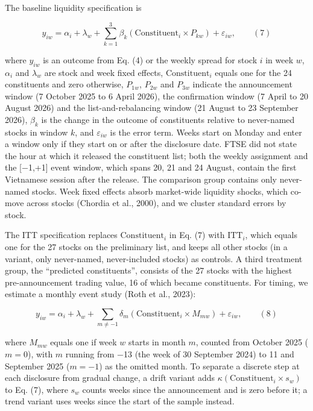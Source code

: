 The baseline liquidity specification is

\[y_{iw} = \alpha_i + \lambda_w + \sum_{k=1}^{3}\beta_k\left(\mathrm{Constituent}_i \times P_{kw}\right) + \varepsilon_{iw}, \qquad (7)\]

where \(y_{iw}\) is an outcome from Eq. (4) or the weekly spread for
stock \(i\) in week \(w\), \(\alpha_i\) and \(\lambda_w\) are stock and
week fixed effects, \(\mathrm{Constituent}_i\) equals one for the 24
constituents and zero otherwise, \(P_{1w}\), \(P_{2w}\) and \(P_{3w}\)
indicate the announcement window (7 October 2025 to 6 April 2026), the
confirmation window (7 April to 20 August 2026) and the
list-and-rebalancing window (21 August to 23 September 2026),
\(\beta_k\) is the change in the outcome of constituents relative to
never-named stocks in window \(k\), and \(\varepsilon_{iw}\) is the
error term. Weeks start on Monday and enter a window only if they start
on or after the disclosure date. FTSE did not state the hour at which it
released the constituent list; both the weekly assignment and the
{[}−1,+1{]} event window, which spans 20, 21 and 24 August, contain the
first Vietnamese session after the release. The comparison group
contains only never-named stocks. Week fixed effects absorb market-wide
liquidity shocks, which co-move across stocks (Chordia et al., 2000),
and we cluster standard errors by stock.

The ITT specification replaces \(\mathrm{Constituent}_i\) in Eq. (7)
with \(\mathrm{ITT}_i\), which equals one for the 27 stocks on the
preliminary list, and keeps all other stocks (in a variant, only
never-named, never-included stocks) as controls. A third treatment
group, the ``predicted constituents'', consists of the 27 stocks with
the highest pre-announcement trading value, 16 of which became
constituents. For timing, we estimate a monthly event study (Roth et
al., 2023):

\[y_{iw} = \alpha_i + \lambda_w + \sum_{m \neq -1}\delta_m\left(\mathrm{Constituent}_i \times M_{mw}\right) + \varepsilon_{iw}, \qquad (8)\]

where \(M_{mw}\) equals one if week \(w\) starts in month \(m\), counted
from October 2025 (\(m = 0\)), with \(m\) running from −13 (the week of
30 September 2024) to 11 and September 2025 (\(m = -1\)) as the omitted
month. To separate a discrete step at each disclosure from gradual
change, a drift variant adds
\(\kappa\left(\mathrm{Constituent}_i \times s_w\right)\) to Eq. (7),
where \(s_w\) counts weeks since the announcement and is zero before it;
a trend variant uses weeks since the start of the sample instead.

